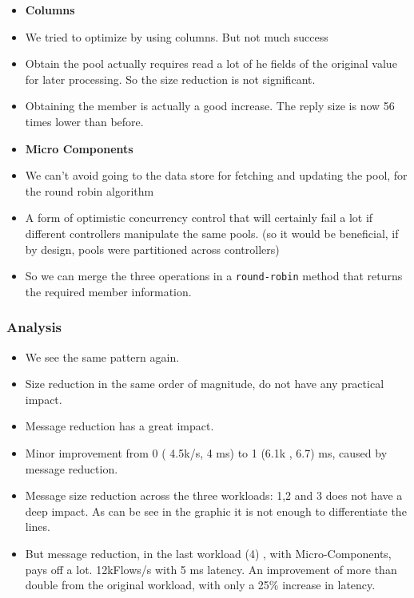 \begin{itemize}
\begin{itemize}
\item \textbf{Columns}
\item We tried to optimize by using columns. But not much success
\item Obtain the pool actually requires read a lot of he fields of the
  original value for later processing. So the size reduction is not
  significant. 
\item Obtaining the member is actually a good increase. The reply
  size is now 56 times lower than before. 
\end{itemize}

\begin{itemize}
\item \textbf{Micro Components}
\item We can't avoid going to the data store for fetching and updating
  the pool, for the round robin algorithm
\item A form of optimistic concurrency control that will certainly
  fail a lot if different controllers manipulate the same pools. (so
  it would be beneficial, if by design, pools were partitioned across
  controllers)
\item So we can merge the three operations in a \texttt{round-robin}
  method that returns the required member information. 
\end{itemize}
\end{itemize}

\subsubsection{Analysis}
\begin{itemize}
\item We see the same pattern again. 
\item Size reduction in the same order of magnitude, do not have any
  practical impact.
\item Message reduction has a great impact. 
\item Minor improvement from 0 ( 4.5k/s,  4 ms) to  1 (6.1k , 6.7) ms,
  caused by message reduction. 
\item Message size reduction across the three workloads: 1,2 and 3
  does not have a deep impact. As can be see in the graphic it is not
  enough to differentiate the lines. 
\item  But message reduction, in the last workload (4) , with
  Micro-Components, pays off a lot. 12kFlows/s with 5 ms latency. An
  improvement of more than double from the original workload, with
  only a 25\% increase in latency. 
\end{itemize} 


